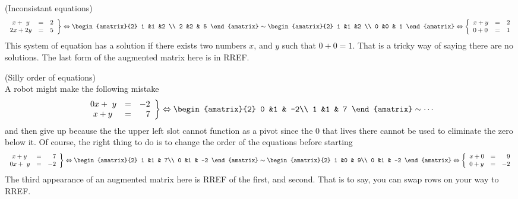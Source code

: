 \begin{example} (Inconsistant equations)
\[
   \left.
\begin{array}{lcr}
	\ x + \ y & = & 2 \\
	2x + 2y & = &  5
     \end{array}
   \right\} 
   \Leftrightarrow
\begin{amatrix}{2}
1 &1 &2 \\ 2 &2 & 5
\end{amatrix}
\sim
\begin{amatrix}{2}
1 &1 &2 \\ 0 &0 & 1
\end{amatrix}
\Leftrightarrow
\left\{
\begin{array}{lcr}
	x + y & = & 2 \\
	 0 + 0 & = &  1
     \end{array}
   \right.
\]
This system of equation has a solution if there exists two numbers $x$, and $y$ such that $0+0=1$. That is a tricky way of saying there are no solutions. The last form of the augmented matrix here is in RREF.
\end{example}


\begin{example} (Silly order of equations)\\
A robot might make the following mistake
\[
   \left.
\begin{array}{lcr}
	0x +  \ y & = & -2 \\
	\ x + y & = &  7
     \end{array}
   \right\} 
   \Leftrightarrow 
\begin{amatrix}{2}
0 &1 & -2\\ 1 &1 & 7
\end{amatrix}
\sim \cdots
\]
and then give up because the the upper left slot cannot function as a pivot since the 0 that lives there cannot be used to eliminate the zero below it. Of course, the right thing to do is to change the order of the equations before starting
\[
   \left.
\begin{array}{lcr}
	\ x + y & = &  7
	\\
	0x +  \ y & = & -2 
	     \end{array}
   \right\} 
   \Leftrightarrow
\begin{amatrix}{2}
1 &1 & 7\\ 0 &1 & -2
\end{amatrix}
\sim 
\begin{amatrix}{2}
1 &0 & 9\\ 0 &1 & -2
\end{amatrix}
\Leftrightarrow
\left\{
\begin{array}{lcr}
	x + 0 & = & 9 \\
	 0 + y & = & -2
     \end{array}
   \right.
\]
The third appearance of an augmented matrix here is RREF of the first, and second. That is to say, you can swap rows on your way to RREF.
\end{example}



